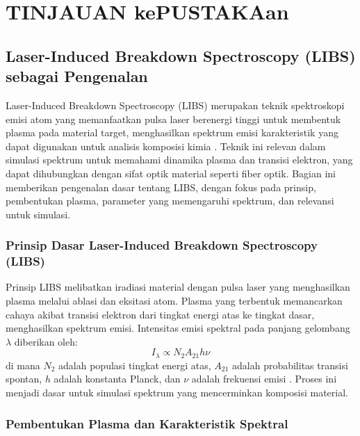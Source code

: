 
\chapter{TINJAUAN kePUSTAKAan}
\section{Laser-Induced Breakdown Spectroscopy (LIBS) sebagai Pengenalan}
\label{sec:libs_intro}

Laser-Induced Breakdown Spectroscopy (LIBS) merupakan teknik spektroskopi emisi atom yang memanfaatkan pulsa laser berenergi tinggi untuk membentuk plasma pada material target, menghasilkan spektrum emisi karakteristik yang dapat digunakan untuk analisis komposisi kimia \citep{Singh2023}. Teknik ini relevan dalam simulasi spektrum untuk memahami dinamika plasma dan transisi elektron, yang dapat dihubungkan dengan sifat optik material seperti fiber optik. Bagian ini memberikan pengenalan dasar tentang LIBS, dengan fokus pada prinsip, pembentukan plasma, parameter yang memengaruhi spektrum, dan relevansi untuk simulasi.

\subsection{Prinsip Dasar Laser-Induced Breakdown Spectroscopy (LIBS)}
\label{subsec:libs_principles}

Prinsip LIBS melibatkan iradiasi material dengan pulsa laser yang menghasilkan plasma melalui ablasi dan eksitasi atom. Plasma yang terbentuk memancarkan cahaya akibat transisi elektron dari tingkat energi atas ke tingkat dasar, menghasilkan spektrum emisi. Intensitas emisi spektral pada panjang gelombang \( \lambda \) diberikan oleh:
\[
I_{\lambda} \propto N_2 A_{21} h \nu
\]
di mana \( N_2 \) adalah populasi tingkat energi atas, \( A_{21} \) adalah probabilitas transisi spontan, \( h \) adalah konstanta Planck, dan \( \nu \) adalah frekuensi emisi \citep{Singh2023}. Proses ini menjadi dasar untuk simulasi spektrum yang mencerminkan komposisi material.

\subsection{Pembentukan Plasma dan Karakteristik Spektral}
\label{subsec:plasma_formation}

